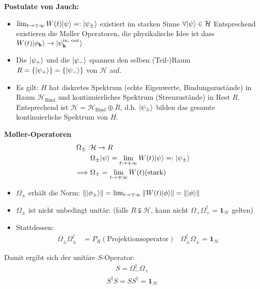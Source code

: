 \documentclass[11pt,a4paper]{report}
\newcommand{\norm}[1]{\left\lVert #1 \right\rVert}
\begin{document}
\textbf{Postulate von Jauch:}
\begin{itemize}
    \item $\lim_{t \rightarrow \mp \infty} W(t) |\psi\rangle =: |\psi_{\pm}\rangle $ existiert im starken Sinne $\forall |\psi\rangle \in \mathcal{H}$
    Entsprechend existieren die M{\o}ller Operatoren, die physikalische Idee ist dass $W(t) |\phi_{\mathbf{k}}\rangle \rightarrow |\psi_{\mathbf{k}}^{\text{in, out}}\rangle$
    \item Die $|\psi_+\rangle$ und die $|\psi_-\rangle$ spannen den selben (Teil-)Raum $R = \{|\psi_+\rangle\} = \{ |\psi_-\rangle \}$ von $\mathcal{H}$ auf.
    \item Es gilt: $H$ hat diskretes Spektrum (echte Eigenwerte, Bindungszustände) in Raum $\mathcal{H}_{\text{Bind}}$ und kontinuierliches Spektrum (Streuzustände) in Rest $R$. 
    Entsprechend ist $\mathcal{H} = \mathcal{H}_{\text{Bind}} \oplus R$, d.h. $|\psi_\pm\rangle$ bilden das gesamte kontinuierliche Spektrum von $H$.
\end{itemize}

\textbf{M{\o}ller-Operatoren}
\begin{align*}
    \Omega_\pm :& \mathcal{H} \rightarrow R \\
& \Omega_\pm |\psi\rangle = \lim_{t \rightarrow \mp \infty} W(t) |\psi\rangle =: |\psi_\pm\rangle \\
\implies & \Omega_\pm = \lim_{t \rightarrow \mp \infty} W(t) (\text{stark})
\end{align*}
\begin{itemize}
    \item $\Omega_\pm$ erhält die Norm: $\norm{\ket{\phi_\pm}} = \lim_{t \rightarrow \mp \infty} \norm{W(t) \ket{\phi}} = \norm{\ket{\phi}} $
    \item $\Omega_\pm$ ist nicht unbedingt unitär: (falls $R \subsetneqq \mathcal{H}$, kann nicht $\Omega_+ \Omega_+^\dagger = \mathbf{1}_{\mathcal{H}}$ gelten)
    \item Stattdessen: 
    \begin{align*}
        \Omega_\pm \Omega_\pm^\dagger &= P_R (\text{Projektionsoperator}) & \Omega_\pm^\dagger \Omega_\pm = \mathbf{1}_{\mathcal{H}} 
    \end{align*}
\end{itemize}

Damit ergibt sich der unitäre $S$-Operator:
\begin{align*}
    \boxed{S = \Omega_-^\dagger \Omega_+} 
\end{align*}
\begin{align*}
    S^\dagger S = S S^\dagger = \mathbf{1}_{\mathcal{H}}
\end{align*}
\end{document}
